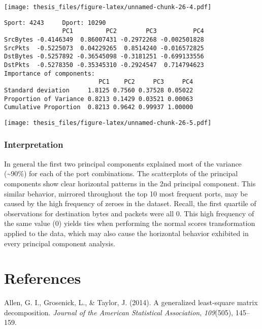 \documentclass[12pt,twoside]{dukestatscithesis}
\theoremstyle{definition}
\theoremstyle{definition}
\theoremstyle{definition}
\theoremstyle{remark}
\begin{document}
\texttt{[image: thesis\_files/figure-latex/unnamed-chunk-26-4.pdf]}
\begin{verbatim}
Sport: 4243     Dport: 10290 
                PC1         PC2        PC3          PC4
SrcBytes -0.4146349  0.86007431 -0.2972268 -0.002501828
SrcPkts  -0.5225073  0.04229265  0.8514240 -0.016572825
DstBytes -0.5257892 -0.36545098 -0.3181251 -0.699133556
DstPkts  -0.5278350 -0.35345310 -0.2924547  0.714794623
Importance of components:
                          PC1    PC2     PC3     PC4
Standard deviation     1.8125 0.7560 0.37528 0.05022
Proportion of Variance 0.8213 0.1429 0.03521 0.00063
Cumulative Proportion  0.8213 0.9642 0.99937 1.00000
\end{verbatim}
\texttt{[image: thesis\_files/figure-latex/unnamed-chunk-26-5.pdf]}

\subsection{Interpretation}\label{interpretation}

In general the first two principal components explained most of the
variance (\textasciitilde{}90\%) for each of the port combinations. The
scatterplots of the principal components show clear horizontal patterns
in the 2nd principal component. This similar behavior, mirrored
throughout the top 10 most frequent ports, may be caused by the high
frequency of zeroes in the dataset. Recall, the first quartile of
observations for destination bytes and packets were all 0. This high
frequency of the same value (0) yields ties when performing the normal
scores transformation applied to the data, which may also cause the
horizontal behavior exhibited in every principal component analysis.

\backmatter

\chapter*{References}\label{references}


\noindent

\setlength{\parindent}{-0.20in} \setlength{\leftskip}{0.20in}
\setlength{\parskip}{8pt}

\hypertarget{refs}{}
\hypertarget{ref-GLSmatrix2013}{}
Allen, G. I., Grosenick, L., \& Taylor, J. (2014). A generalized
least-square matrix decomposition. \emph{Journal of the American
Statistical Association}, \emph{109}(505), 145--159.
\end{document}
